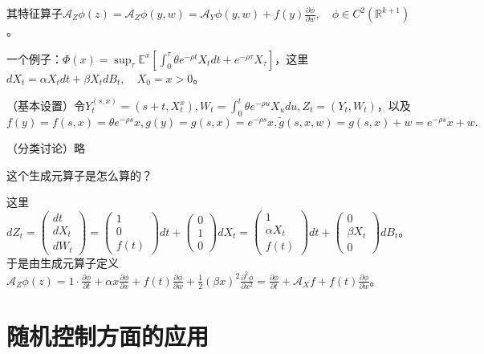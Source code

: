 其特征算子$\mathcal{A}_{Z} \phi(z)=\mathcal{A}_{Z} \phi(y, w)=\mathcal{A}_{Y} \phi(y, w)+f(y) \frac{\partial \phi}{\partial w}, \quad \phi \in C^{2}\left(\mathbb{R}^{k+1}\right)$。

一个例子：$\Phi(x)=\sup _{\tau} \mathbb{E}^{x}\left[\int_{0}^{\tau} \theta e^{-\rho t} X_{t} d t+e^{-\rho \tau} X_{\tau}\right]$，这里$d X_{t}=\alpha X_{t} d t+\beta X_{t} d B_{t}, \quad X_{0}=x>0$。

（基本设置）令$Y_{t}^{(s, x)}=\left(s+t, X_{t}^{x}\right), W_{t}=\int_{0}^{t} \theta e^{-\rho u} X_{u} d u, Z_{t}=\left(Y_{t}, W_{t}\right)$，以及$ f(y)=f(s, x)=\theta e^{-\rho s} x, g(y)=g(s, x)=e^{-\rho s} x, \tilde{g}(s, x, w)=g(s, x)+w=e^{-\rho s} x+w .$

（分类讨论）略

这个生成元算子是怎么算的？

这里$d Z_{t}=\left(\begin{array}{c}
  d t \\
  d X_t \\
  d W_{t}
\end{array}\right)=\left(\begin{array}{c}
  1 \\
  0 \\
  f(t)
\end{array}\right) d t+\left(\begin{array}{l}
  0 \\
  1 \\
  0
\end{array}\right) d X_{t} = \left(\begin{array}{c}
  1 \\
  \alpha X_t \\
  f(t)
\end{array}\right) d t+\left(\begin{array}{l}
  0 \\
  \beta X_t \\
  0
\end{array}\right) d B_{t}$。于是由生成元算子定义$\mathcal{A}_{Z} \phi(z) = 1 \cdot \frac{\partial \phi}{\partial t} + \alpha x \frac{\partial \phi}{\partial x} + f(t) \frac{\partial \phi}{\partial w} + \frac{1}{2} (\beta x)^2 \frac{\partial^2 \phi}{\partial x^2} = \frac{\partial \phi}{\partial t} + 
\mathcal{A}_X f + f(t) \frac{\partial \phi}{\partial w}$。


\section{随机控制方面的应用}

